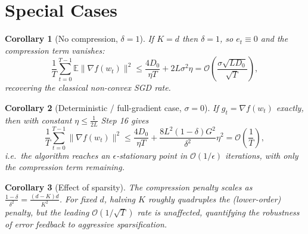 \documentclass[11pt]{article}
\theoremstyle{plain}
\newtheorem{corollary}{Corollary}
\begin{document}
\section*{Special Cases}

\begin{corollary}[No compression, $\delta=1$]
If $K=d$ then $\delta=1$, so $e_t\equiv0$ and the compression term vanishes:
\[
\frac{1}{T}\sum_{t=0}^{T-1}\mathbb{E}\|\nabla f(w_t)\|^2
\le\frac{4D_0}{\eta T}+2L\sigma^2\eta
=\mathcal{O}\!\left(\frac{\sigma\sqrt{LD_0}}{\sqrt{T}}\right),
\]
recovering the classical non-convex SGD rate.
\end{corollary}

\begin{corollary}[Deterministic / full-gradient case, $\sigma=0$]
If $g_t=\nabla f(w_t)$ exactly, then with constant $\eta\le\frac{1}{2L}$ Step 16 gives
\[
\frac{1}{T}\sum_{t=0}^{T-1}\|\nabla f(w_t)\|^2
\le\frac{4D_0}{\eta T}+\frac{8L^2(1-\delta)G^2}{\delta^2}\eta^2
=\mathcal{O}\!\left(\frac{1}{T}\right),
\]
i.e.\ the algorithm reaches an $\epsilon$-stationary point in $\mathcal{O}(1/\epsilon)$ iterations, with only the compression term remaining.
\end{corollary}

\begin{corollary}[Effect of sparsity]
The compression penalty scales as $\frac{1-\delta}{\delta^2}=\frac{(d-K)d}{K^2}$. For fixed $d$, halving $K$ roughly quadruples the (lower-order) penalty, but the leading $\mathcal{O}(1/\sqrt{T})$ rate is unaffected, quantifying the robustness of error feedback to aggressive sparsification.
\end{corollary}
\end{document}
